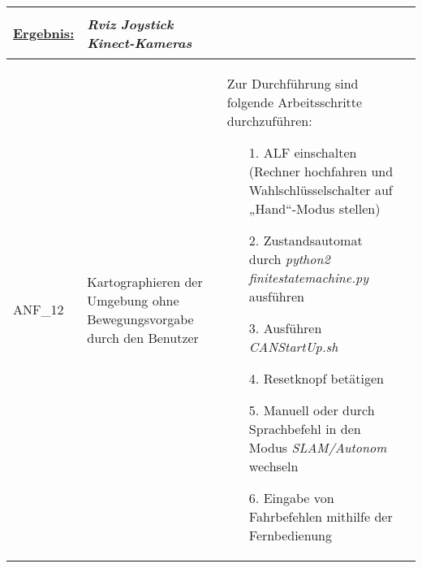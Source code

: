 \documentclass[12pt,a4paper,oneside,numbers=noenddot,captions=tableheading,toc=bibliography,openany,tikz,margin=5mm]{scrbook}
\begin{document}
\begin{longtable}{|p{}|p{}|p{7cm}|p{}|}
\begin{itemize}
			
		\end{itemize}
	
	\underline{Ergebnis:}\newline
	\newline
	
	\textbf{}\textbf{}	%
	& \textit{Rviz}\newline
	\textit{Joystick}\newline
	\textit{Kinect-Kameras}
	\\


	\hline

	ANF\_12& Kartographieren der Umgebung ohne Bewegungsvorgabe durch den Benutzer & Zur Durchführung sind folgende Arbeitsschritte durchzuführen:
	\begin{itemize}
			\item[1.]	ALF einschalten (Rechner hochfahren und Wahlschlüsselschalter auf „Hand“-Modus stellen)
		\item[2.]	Zustandsautomat durch \textit{python2 finitestatemachine.py} ausführen
		\item[3.]	Ausführen \textit{CANStartUp.sh}
		\item[4.]	Resetknopf betätigen
		\item[5.]	Manuell oder durch Sprachbefehl in den Modus \textit{SLAM/Autonom} wechseln
		\item[6.]	Eingabe von Fahrbefehlen mithilfe der Fernbedienung
	\end{itemize}
	

\end{longtable}
\end{document}
